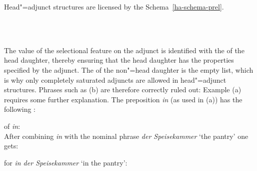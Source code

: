 Head"=adjunct structures are licensed by the Schema~\ref{ha-schema-prel}.
\begin{schema}
\label{ha-schema-prel}
~\\
 \impl\\
\end{schema}
The value of the selectional feature on the adjunct  is identified with the \synsemv of the head daughter, thereby ensuring that the head
daughter has the properties specified by the adjunct. The  \subcatv of the non"=head daughter is the
empty list, which is why only completely saturated adjuncts are allowed in head"=adjunct structures. Phrases such as (b) are therefore correctly ruled out:
\eal
{}
\zl
Example (a) requires some further explanation. The preposition \emph{in} (as used in (a)) has the following \catv:

\ea
\catv of \emph{in}:\\
\z
After combining \emph{in} with the nominal phrase \emph{der Speisekammer} `the pantry' one gets:

\eas
\catv for \emph{in der Speisekammer} `in the pantry':\\
\zs

